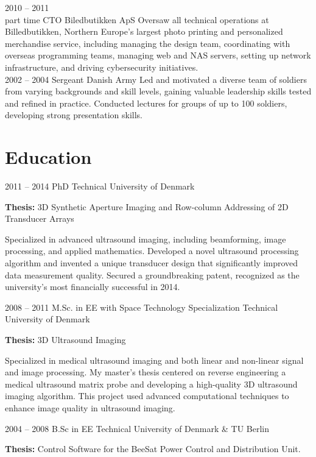 \documentclass[8pt]{mofiicv}
\begin{document}
\begin{minipage}[T]{\SecondColumnWidth}
\begin{entrylist}
			{2010 -- 2011\\\footnotesize{part time}}
			{CTO}
			{Biledbutikken ApS}
			{
			Oversaw all technical operations at Billedbutikken, Northern Europe's largest photo printing and personalized merchandise service, including managing the design team, coordinating with overseas programming teams, managing web and NAS servers, setting up network infrastructure, and driving cybersecurity initiatives.\\
			}
		\entry
			{2002 -- 2004}
			{Sergeant}
			{Danish Army}
			{
			Led and motivated a diverse team of soldiers from varying backgrounds and skill levels, gaining valuable leadership skills tested and refined in practice. Conducted lectures for groups of up to 100 soldiers, developing strong presentation skills.\\ 
			}
	\end{entrylist}

	\section{Education}
	\begin{entrylist}
		\entry
			{2011 -- 2014}
			{PhD}
			{Technical University of Denmark}
			{\textbf{Thesis:} 3D Synthetic Aperture Imaging and Row-column Addressing of 2D Transducer Arrays

			Specialized in advanced ultrasound imaging, including beamforming, image processing, and applied mathematics. Developed a novel ultrasound processing algorithm and invented a unique transducer design that significantly improved data measurement quality. Secured a groundbreaking patent, recognized as the university's most financially successful in 2014.}
		\entry
			{2008 -- 2011}
			{M.Sc. in EE with Space Technology Specialization}
			{Technical University of Denmark}
			{\textbf{Thesis:} 3D Ultrasound Imaging

			Specialized in medical ultrasound imaging and both linear and non-linear signal and image processing. My master's thesis centered on reverse engineering a medical ultrasound matrix probe and developing a high-quality 3D ultrasound imaging algorithm. 
			This project used advanced computational techniques to enhance image quality in ultrasound imaging.}
		\entry
			{2004 -- 2008}
			{B.Sc in EE}
			{Technical University of Denmark \& TU Berlin} 
			{\textbf{Thesis:} Control Software for the BeeSat Power Control and Distribution Unit.

}
\end{entrylist}
\end{minipage}
\end{document}
